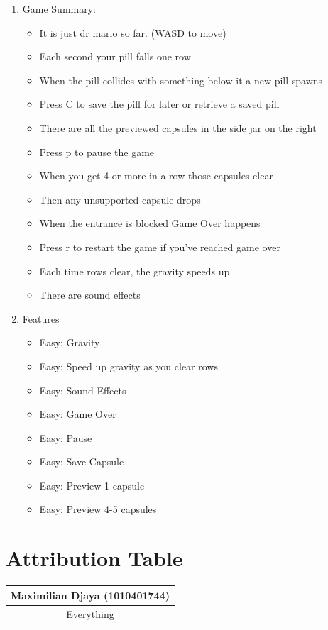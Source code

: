\documentclass{article}
\begin{document}
\begin{enumerate}
\item Game Summary:
\begin{itemize}
\item It is just dr mario so far. (WASD to move)
\item Each second your pill falls one row
\item When the pill collides with something below it a new pill spawns
\item Press C to save the pill for later or retrieve a saved pill
\item There are all the previewed capsules in the side jar on the right
\item Press p to pause the game
\item When you get 4 or more in a row those capsules clear
\item Then any unsupported capsule drops
\item When the entrance is blocked Game Over happens
\item Press r to restart the game if you've reached game over
\item Each time rows clear, the gravity speeds up
\item There are sound effects
\end{itemize}
\item Features
\begin{itemize}
\item Easy: Gravity
\item Easy: Speed up gravity as you clear rows
\item Easy: Sound Effects
\item Easy: Game Over
\item Easy: Pause
\item Easy: Save Capsule
\item Easy: Preview 1 capsule
\item Easy: Preview 4-5 capsules
\end{itemize}

    
\end{enumerate}

\section{Attribution Table}

\begin{center}
\begin{tabular}{|| c ||}
\hline
 Maximilian Djaya (1010401744)\\ 
 \hline
 Everything
\end{tabular}
\end{center}
\end{document}
